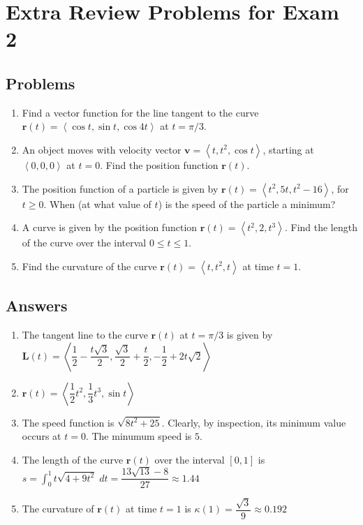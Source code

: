 \documentclass[14pt,letterpaper,fleqn]{article}
\newcommand{\ds}{\displaystyle}
\newcommand{\lv}[1]{\ensuremath{\left\langle #1 \right\rangle}}
\renewcommand{\vec}[1]{\ensuremath{\pmb{#1}}}
\renewcommand{\v}[1]{\ensuremath{\vec{#1}}}
\begin{document}
\section*{Extra Review Problems for Exam 2}
\subsection*{Problems}
\begin{enumerate}
 \item Find a vector function for the line tangent to the curve $\vec{r}(t) = \lv{\cos t, \sin t, \cos 4t}$ at $t = \pi/3$.
 \item An object moves with velocity vector $\vec{v} = \lv{t, t^2, \cos t}$, starting at $\lv{0,0,0}$ at $t = 0$. Find the position function $\vec{r}(t)$.
 \item The position function of a particle is given by $\vec{r}(t) = \lv{t^2, 5t, t^2-16}$, for $t\geq 0$. When (at what value of $t$) is the speed of the particle a minimum?
 \item A curve is given by the position function $\vec{r}(t) = \lv{t^2, 2, t^3}$. Find the length of the curve over the interval $0\leq t\leq 1$.
 \item Find the curvature of the curve $\vec{r}(t)=\lv{t, t^2, t}$ at time $t = 1$.
\end{enumerate}
\subsection*{Answers}
\begin{enumerate}
 \item The tangent line to the curve $\vec{r}(t)$ at $t=\pi/3$ is given by $\v{L}(t) = \lv{\dfrac{1}{2} - \dfrac{t\sqrt{3}}{2}, \dfrac{\sqrt{3}}{2} + \dfrac{t}{2}, -\dfrac{1}{2} + 2t\sqrt{2}}$
 \item $\v{r}(t) = \lv{\dfrac{1}{2}t^2, \dfrac{1}{3}t^3, \sin t}$
 \item The speed function is $\sqrt{8t^2 + 25}$. Clearly, by inspection, its minimum value occurs at $t = 0$. The minumum speed is $5$.
 \item The length of the curve $\v{r}(t)$ over the interval $[0,1]$ is $s = \ds\int_0^1 t\sqrt{4 + 9t^2}\;dt = \dfrac{13\sqrt{13} - 8}{27}\approx 1.44$
 \item The curvature of $\v{r}(t)$ at time $t = 1$ is $\kappa(1) = \dfrac{\sqrt{3}}{9}\approx 0.192$
\end{enumerate}
\end{document}
